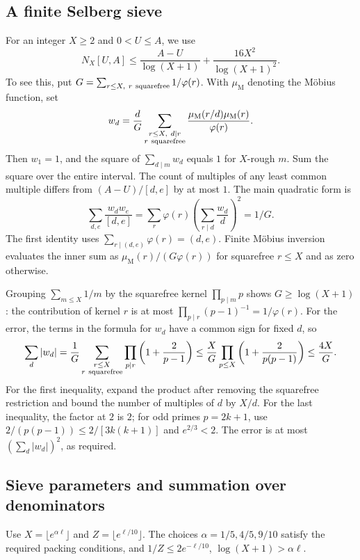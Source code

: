 \documentclass[11pt,a4paper]{article}
\begin{document}
\subsection{A finite Selberg sieve}

For an integer \(X\ge2\) and \(0<U\le A\), we use
\[
 N_X[U,A]\le\frac{A-U}{\log(X+1)}+\frac{16X^2}{\log(X+1)^2}.
\]
To see this, put
\(G=\sum_{r\le X,\ r\ {\rm squarefree}}1/\varphi(r)\).
With \(\mu_{\mathrm M}\) denoting the M\"obius function, set
\[
 w_d=\frac dG\sum_{\substack{r\le X,\ d\mid r\\ r\ {\rm squarefree}}}
         \frac{\mu_{\mathrm M}(r/d)\mu_{\mathrm M}(r)}{\varphi(r)}.
\]
Then \(w_1=1\), and the square of \(\sum_{d\mid m}w_d\) equals \(1\)
for \(X\)-rough \(m\). Sum the square over the entire interval.
The count of multiples of any least common multiple differs from
\((A-U)/[d,e]\) by at most \(1\). The main quadratic form is
\[
 \sum_{d,e}\frac{w_dw_e}{[d,e]}
 =\sum_r\varphi(r)\left(\sum_{r\mid d}\frac{w_d}{d}\right)^2
 =1/G.
\]
The first identity uses \(\sum_{r\mid(d,e)}\varphi(r)=(d,e)\).
Finite M\"obius inversion evaluates the inner sum as
\(\mu_{\mathrm M}(r)/(G\varphi(r))\) for squarefree \(r\le X\) and
as zero otherwise.

Grouping \(\sum_{m\le X}1/m\) by the squarefree kernel
\(\prod_{p\mid m}p\) shows \(G\ge\log(X+1)\): the contribution of
kernel \(r\) is at most \(\prod_{p\mid r}(p-1)^{-1}=1/\varphi(r)\).
For the error, the terms in the formula for \(w_d\) have a common
sign for fixed \(d\), so
\[
 \sum_d|w_d|=\frac1G\sum_{\substack{r\le X\\r\ {\rm squarefree}}}
        \prod_{p\mid r}\left(1+\frac2{p-1}\right)
 \le \frac XG\prod_{p\le X}\left(1+\frac2{p(p-1)}\right)
 \le \frac{4X}G.
\]
For the first inequality, expand the product after removing the
squarefree restriction and bound the number of multiples of \(d\)
by \(X/d\). For the last inequality, the factor at \(2\) is \(2\);
for odd primes \(p=2k+1\), use
\(2/(p(p-1))\le 2/[3k(k+1)]\) and \(e^{2/3}<2\).
The error is at most \((\sum_d|w_d|)^2\), as required.

\subsection{Sieve parameters and summation over denominators}

Use \(X=\lfloor e^{\alpha\ell}\rfloor\) and
\(Z=\lfloor e^{\ell/10}\rfloor\). The choices
\(\alpha=1/5,4/5,9/10\) satisfy the required packing conditions,
and \(1/Z\le2e^{-\ell/10}\), \(\log(X+1)>\alpha\ell\).
\end{document}
